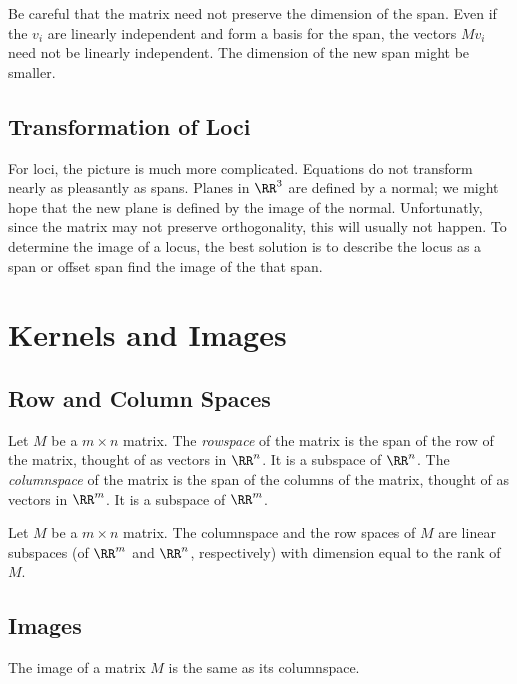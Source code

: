 \documentclass[fleqn]{report}
\begin{document}
Be careful that the matrix need not preserve the dimension of the
span. Even if the $v_i$ are linearly independent and form a
basis for the span, the vectors $Mv_i$ need not be linearly
independent. The dimension of the new span might be smaller.

\subsection{Transformation of Loci}
\label{transformations-of-loci}

For loci, the picture is much more complicated. Equations do
not transform nearly as pleasantly as spans. Planes in $\RR^3$
are defined by a normal; we might hope that the new plane is
defined by the image of the normal. Unfortunatly, since the
matrix may not preserve orthogonality, this will usually not
happen. To determine the image of a locus, the best solution
is to describe the locus as a span or offset span find the
image of the that span.

\section{Kernels and Images}
\label{kernels-and-images}

\subsection{Row and Column Spaces}
\label{row-and-column-spaces}

\begin{defn}
Let $M$ be a $m \times n$ matrix. The \emph{rowspace} of the
matrix is the span of the row of the matrix, thought of as
vectors in $\RR^n$. It is a subspace of $\RR^n$. The
\emph{columnspace} of the matrix is the span of the columns of
the matrix, thought of as vectors in $\RR^m$. It is a
subspace of $\RR^m$. 
\end{defn}

\begin{prop}
Let $M$ be a $m \times n$ matrix. The columnspace and the row
spaces of $M$ are linear subspaces (of $\RR^m$ and $\RR^n$,
respectively) with dimension equal to the rank of $M$.
\end{prop}

\subsection{Images}
\label{images}

\begin{prop}
The image of a matrix $M$ is the same as its columnspace.
\end{prop}
\end{document}
